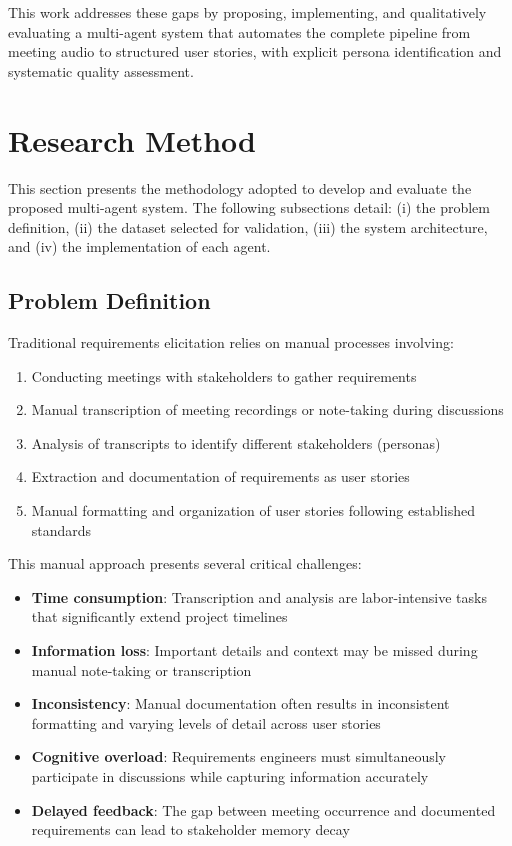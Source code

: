 \documentclass[12pt]{article}
\begin{document}
This work addresses these gaps by proposing, implementing, and qualitatively evaluating a multi-agent system that automates the complete pipeline from meeting audio to structured user stories, with explicit persona identification and systematic quality assessment.

\section{Research Method}
\label{sec:method}

This section presents the methodology adopted to develop and evaluate the proposed multi-agent system. The following subsections detail: (i) the problem definition, (ii) the dataset selected for validation, (iii) the system architecture, and (iv) the implementation of each agent.


\subsection{Problem Definition}
\label{sec:problem}

Traditional requirements elicitation relies on manual processes involving:

\begin{enumerate}
    \item Conducting meetings with stakeholders to gather requirements
    \item Manual transcription of meeting recordings or note-taking during discussions
    \item Analysis of transcripts to identify different stakeholders (personas)
    \item Extraction and documentation of requirements as user stories
    \item Manual formatting and organization of user stories following established standards
\end{enumerate}

This manual approach presents several critical challenges:

\begin{itemize}
    \item \textbf{Time consumption}: Transcription and analysis are labor-intensive tasks that significantly extend project timelines
    \item \textbf{Information loss}: Important details and context may be missed during manual note-taking or transcription
    \item \textbf{Inconsistency}: Manual documentation often results in inconsistent formatting and varying levels of detail across user stories
    \item \textbf{Cognitive overload}: Requirements engineers must simultaneously participate in discussions while capturing information accurately
    \item \textbf{Delayed feedback}: The gap between meeting occurrence and documented requirements can lead to stakeholder memory decay
\end{itemize}
\end{document}
